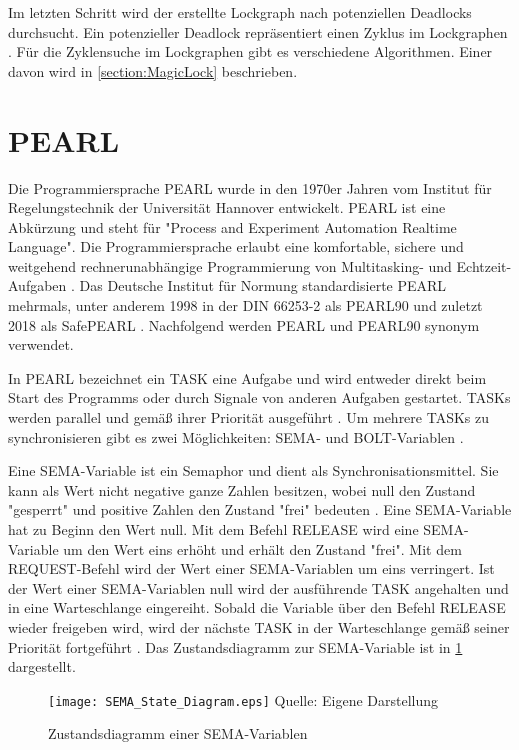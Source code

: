 Im letzten Schritt wird der erstellte Lockgraph nach potenziellen Deadlocks
durchsucht. Ein potenzieller Deadlock repräsentiert einen Zyklus im Lockgraphen
\cites[vgl.][72]{coffman1971system}. Für die Zyklensuche im Lockgraphen gibt es
verschiedene Algorithmen. Einer davon wird in \cref{section:MagicLock}
beschrieben.

\section{PEARL}
\label{section:PEARL}
Die Programmiersprache PEARL wurde in den 1970er Jahren vom Institut für
Regelungstechnik der Universität Hannover entwickelt. PEARL ist eine Abkürzung
und steht für "Process and Experiment Automation Realtime Language". Die
Programmiersprache erlaubt eine komfortable, sichere und weitgehend
rechnerunabhängige Programmierung von Multitasking- und Echtzeit-Aufgaben
\autocite{PEARLHistory}. Das Deutsche Institut für Normung standardisierte PEARL
mehrmals, unter anderem 1998 in der DIN 66253-2 als PEARL90
\autocite{DIN-66253-2:1998-04} und zuletzt 2018 als SafePEARL
\autocite{DIN-66253:2018-03}. Nachfolgend werden PEARL und PEARL90 synonym
verwendet.

In PEARL bezeichnet ein \textrm{TASK} eine Aufgabe und wird entweder direkt beim
Start des Programms oder durch Signale von anderen Aufgaben gestartet.
\textrm{TASKs} werden parallel und gemäß ihrer Priorität ausgeführt
\autocite[vgl.][104]{PEARL}. Um mehrere \textrm{TASKs} zu synchronisieren gibt
es zwei Möglichkeiten: \textrm{SEMA}- und \textrm{BOLT}-Variablen
\autocite[vgl.][120]{PEARL}.

Eine \textrm{SEMA}-Variable ist ein Semaphor und dient als
Synchronisationsmittel. Sie kann als Wert nicht negative ganze Zahlen besitzen,
wobei null den Zustand "gesperrt" und positive Zahlen den Zustand "frei"
bedeuten \autocite[vgl.][120]{PEARL}. Eine \textrm{SEMA}-Variable hat zu Beginn
den Wert null. Mit dem Befehl \textrm{RELEASE} wird eine \textrm{SEMA}-Variable
um den Wert eins erhöht und erhält den Zustand "frei". Mit dem
\textrm{REQUEST}-Befehl wird der Wert einer \textrm{SEMA}-Variablen um eins
verringert. Ist der Wert einer \textrm{SEMA}-Variablen null wird der ausführende
\textrm{TASK} angehalten und in eine Warteschlange eingereiht. Sobald die
Variable über den Befehl \textrm{RELEASE} wieder freigeben wird, wird der
nächste \textrm{TASK} in der Warteschlange gemäß seiner Priorität fortgeführt
\autocite[vgl.][120-121]{PEARL}. Das Zustandsdiagramm zur \textrm{SEMA}-Variable
ist in \cref{fig:SEMA_StateDiagram} dargestellt.
\begin{figure}[ht]
  \texttt{[image: SEMA\_State\_Diagram.eps]}
  \footnotesize\sffamily Quelle: Eigene Darstellung
  \caption{Zustandsdiagramm einer SEMA-Variablen}
  \label{fig:SEMA_StateDiagram}
\end{figure}

